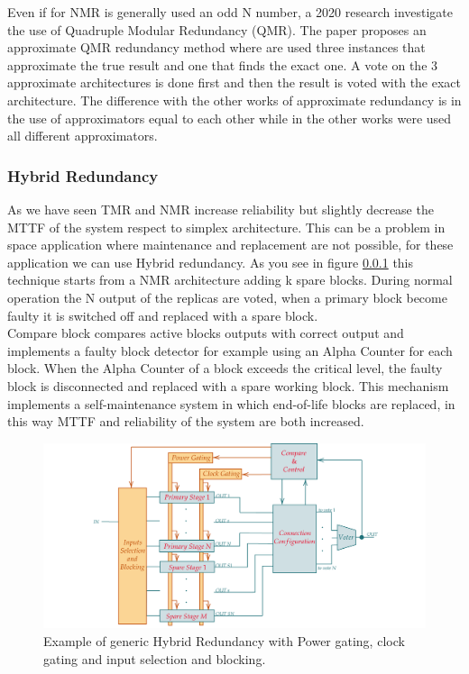 {{{{		        Even if for NMR is generally used an odd N number, a 2020 research \cite{Highly-Reliable_Approximate_Quadruple_Modular_Redundancy_with_Approximation-Aware_Voting} investigate the use of Quadruple Modular Redundancy (QMR). The paper proposes an approximate QMR redundancy method where are used three instances that approximate the true result and one that finds the exact one. A vote on the 3 approximate architectures is done first and then the result is voted with the exact architecture. The difference with the other works of approximate redundancy is in the use of approximators equal to each other while in the other works were used all different approximators.  
		    }
		    \subsubsection{Hybrid Redundancy}{
		       As we have seen TMR and NMR increase reliability but slightly decrease the MTTF of the system respect to simplex architecture. This can be a problem in space application where maintenance and replacement are not possible, for these application we can use Hybrid redundancy.
		       As you see in figure \ref{} this technique starts from a NMR architecture adding k spare blocks. During normal operation the N output of the replicas are voted, when a primary block become faulty it is switched off and replaced with a spare block. \\
		       
		       Compare block compares active blocks outputs with correct output and implements a faulty block detector for example using an Alpha Counter for each block. When the Alpha Counter of a block exceeds the critical level, the faulty block is disconnected and replaced with a spare working block.
		       This mechanism implements a self-maintenance system in which end-of-life blocks are replaced, in this way MTTF and reliability of the system are both increased. \\
		       
        		\begin{figure}[H]
        			\centering
        			\includegraphics[scale=0.2,center]{./images/HybridRedundancy.png}
        			\caption{Example of generic Hybrid Redundancy with Power gating, clock gating and input selection and blocking.}
        			\label{fig:TMR5}
        		\end{figure} 
		       
}}}}
